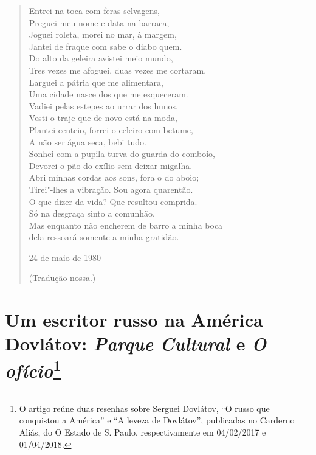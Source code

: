 \begin{verse}
Entrei na toca com feras selvagens, \\
Preguei meu nome e data na barraca, \\
Joguei roleta, morei no mar, à margem, \\
Jantei de fraque com sabe o diabo quem. \\[8pt]
Do alto da geleira avistei meio mundo, \\
Tres vezes me afoguei, duas vezes me \qb{}cortaram. \\
Larguei a pátria que me alimentara, \\
Uma cidade nasce dos que me esqueceram. \\[8pt]
Vadiei pelas estepes ao urrar dos hunos, \\
Vesti o traje que de novo está na moda, \\
Plantei centeio, forrei o celeiro com betume, \\
A não ser água seca, bebi tudo. \\[8pt]
Sonhei com a pupila turva do guarda do \qb{}comboio, \\
Devorei o pão do exílio sem deixar migalha. \\
Abri minhas cordas aos sons, fora o do aboio; \\
Tirei"-lhes a vibração. Sou agora quarentão. \\[8pt]
O que dizer da vida? Que resultou comprida. \\
Só na desgraça sinto a comunhão. \\
Mas enquanto não encherem de barro a \qb{}minha boca \\
dela ressoará somente a minha gratidão.

24 de maio de 1980

(Tradução nossa.)

\end{verse}


\chapter*{Um escritor russo na América --- Dovlátov: \emph{Parque Cultural} e \emph{O ofício}\footnote{O artigo reúne duas resenhas sobre Serguei Dovlátov, ``O russo que conquistou a América'' e ``A leveza de Dovlátov'', publicadas no Carderno Aliás, do {O Estado de S. Paulo}, respectivamente em 04/02/2017 e 01/04/2018.}}


